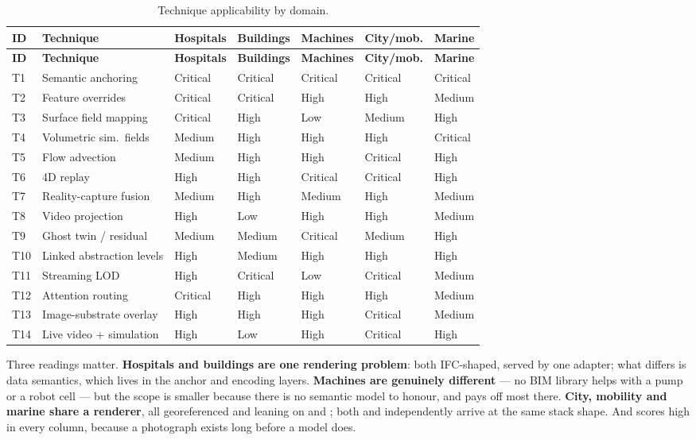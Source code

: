 \begin{longtable}{@{}L{0.8cm}L{4.0cm}C{1.6cm}C{1.6cm}C{1.6cm}C{1.6cm}C{1.6cm}@{}}
\caption{Technique applicability by domain.}\label{tab:domains}\\
\toprule
\textbf{ID} & \textbf{Technique} & \textbf{Hospitals} & \textbf{Buildings} &
\textbf{Machines} & \textbf{City/mob.} & \textbf{Marine} \\
\midrule
\endfirsthead
\toprule
\textbf{ID} & \textbf{Technique} & \textbf{Hospitals} & \textbf{Buildings} &
\textbf{Machines} & \textbf{City/mob.} & \textbf{Marine} \\
\midrule
\endhead
T1 & Semantic anchoring & Critical & Critical & Critical & Critical & Critical \\
T2 & Feature overrides & Critical & Critical & High & High & Medium \\
T3 & Surface field mapping & Critical & High & Low & Medium & High \\
T4 & Volumetric sim.\ fields & Medium & High & High & High & Critical \\
T5 & Flow advection & Medium & High & High & Critical & High \\
T6 & 4D replay & High & High & Critical & Critical & High \\
T7 & Reality-capture fusion & Medium & High & Medium & High & Medium \\
T8 & Video projection & High & Low & High & High & Medium \\
T9 & Ghost twin / residual & Medium & Medium & Critical & Medium & High \\
T10 & Linked abstraction levels & High & Medium & High & High & High \\
T11 & Streaming LOD & High & Critical & Low & Critical & Medium \\
T12 & Attention routing & Critical & High & High & High & Medium \\
T13 & Image-substrate overlay & High & High & High & Critical & Medium \\
T14 & Live video + simulation & High & Low & High & Critical & High \\
\bottomrule
\end{longtable}

\noindent
Three readings matter. \textbf{Hospitals and buildings are one rendering problem}: both
IFC-shaped, served by one adapter; what differs is data semantics, which lives in the
anchor and encoding layers. \textbf{Machines are genuinely different} --- no BIM library
helps with a pump or a robot cell --- but the scope is smaller because there is no
semantic model to honour, and  pays off most there. \textbf{City, mobility and
marine share a renderer}, all georeferenced and leaning on  and ; both
\citet{rundel2023leveraging} and \citet{vasilijevic2024trondheim} independently arrive at
the same stack shape. And  scores high in every column, because a photograph
exists long before a model does.

